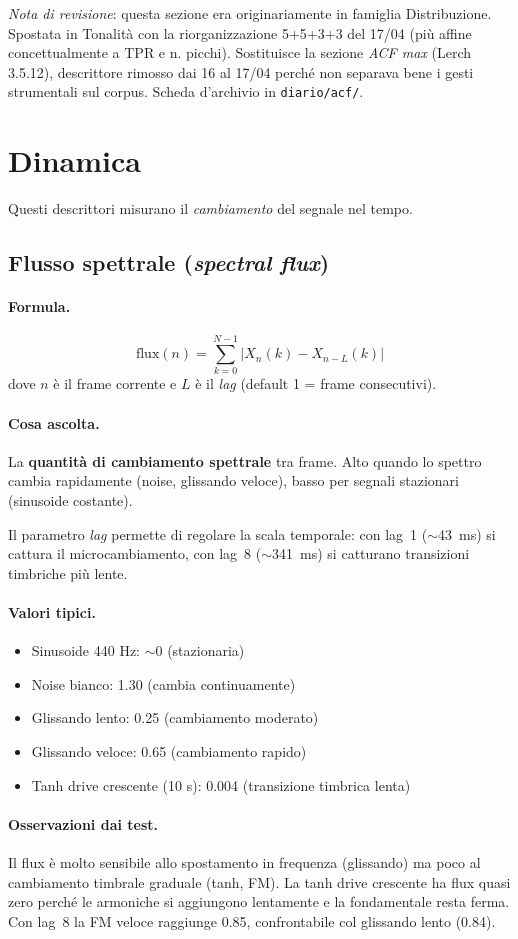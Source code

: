 \documentclass[a4paper,11pt]{article}
\newcommand{\desc}[1]{\subsection{#1}}
\newcommand{\formula}{\paragraph{Formula.}}
\newcommand{\ascolta}{\paragraph{Cosa ascolta.}}
\newcommand{\range}{\paragraph{Valori tipici.}}
\newcommand{\oss}{\paragraph{Osservazioni dai test.}}
\begin{document}
\bigskip
\noindent\textit{Nota di revisione}: questa sezione era originariamente
in famiglia Distribuzione. Spostata in Tonalità con la riorganizzazione
5+5+3+3 del 17/04 (più affine concettualmente a TPR e n. picchi).
Sostituisce la sezione \emph{ACF max} (Lerch 3.5.12), descrittore
rimosso dai 16 al 17/04 perché non separava bene i gesti strumentali
sul corpus. Scheda d'archivio in \texttt{diario/acf/}.


\section{Dinamica}

Questi descrittori misurano il \emph{cambiamento} del segnale nel tempo.

\desc{Flusso spettrale (\emph{spectral flux})}

\formula
\[
  \text{flux}(n) = \sum_{k=0}^{N-1} \big| X_n(k) - X_{n-L}(k) \big|
\]
dove $n$ è il frame corrente e $L$ è il \emph{lag} (default 1 = frame
consecutivi).

\ascolta
La \textbf{quantità di cambiamento spettrale} tra frame. Alto quando lo
spettro cambia rapidamente (noise, glissando veloce), basso per segnali
stazionari (sinusoide costante).

Il parametro \emph{lag} permette di regolare la scala temporale:
con lag~1 ($\sim$43~ms) si cattura il microcambiamento, con lag~8
($\sim$341~ms) si catturano transizioni timbriche più lente.

\range
\begin{itemize}[nosep]
  \item Sinusoide 440 Hz: $\sim$0 (stazionaria)
  \item Noise bianco: 1.30 (cambia continuamente)
  \item Glissando lento: 0.25 (cambiamento moderato)
  \item Glissando veloce: 0.65 (cambiamento rapido)
  \item Tanh drive crescente (10 s): 0.004 (transizione timbrica lenta)
\end{itemize}

\oss Il flux è molto sensibile allo spostamento in frequenza (glissando)
ma poco al cambiamento timbrale graduale (tanh, FM). La tanh drive
crescente ha flux quasi zero perché le armoniche si aggiungono
lentamente e la fondamentale resta ferma. Con lag~8 la FM veloce
raggiunge 0.85, confrontabile col glissando lento (0.84).
\end{document}
